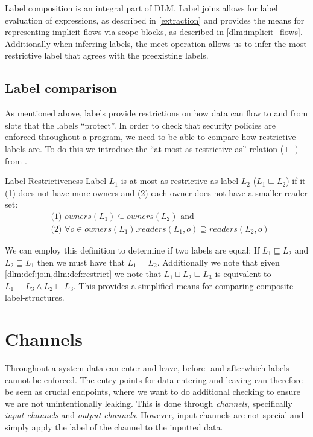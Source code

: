 Label composition is an integral part of DLM.
Label joins allows for label evaluation of expressions, as described in \cref{extraction} and provides the means for representing implicit flows via scope blocks, as described in \cref{dlm:implicit_flows}.
Additionally when inferring labels, the meet operation allows us to infer the most restrictive label that agrees with the preexisting labels.

\subsection{Label comparison}\label{dlm:comparison}
As mentioned above, labels provide restrictions on how data can flow to and from slots that the labels ``protect''.
In order to check that security policies are enforced throughout a program, we need to be able to compare how restrictive labels are.
To do this we introduce the ``at most as restrictive as''-relation ($\sqsubseteq$) from \cite{myers1997}.

\begin{definition}{Label Restrictiveness}\label{dlm:def:restrict}
  Label $L_1$ is at most as restrictive as label $L_2$ ($L_1 \sqsubseteq L_2$) if it (1) does not have more owners and (2) each owner does not have a smaller reader set:
  \begin{align*}
    & \text{(1) } owners(L_1) \subseteq owners(L_2) \text{ and} \\
    & \text{(2) } \forall o \in owners(L_1) . readers(L_1, o) \supseteq readers(L_2, o)
  \end{align*}
\end{definition}

We can employ this definition to determine if two labels are equal:
If $L_1 \sqsubseteq L_2$ and $L_2 \sqsubseteq L_1$ then we must have that $L_1 = L_2$.
Additionally we note that given \cref{dlm:def:join,dlm:def:restrict} we note that $L_1 \sqcup L_2 \sqsubseteq L_3$ is equivalent to $L_1 \sqsubseteq L_3 \wedge L_2 \sqsubseteq L_3$.
This provides a simplified means for comparing composite label-structures.

\section{Channels}\label{dlm:channels}
Throughout a system data can enter and leave, before- and afterwhich labels cannot be enforced.
The entry points for data entering and leaving can therefore be seen as crucial endpoints, where we want to do additional checking to ensure we are not unintentionally leaking.
This is done through \emph{channels}, specifically \emph{input channels} and \emph{output channels}.
However, input channels are not special and simply apply the label of the channel to the inputted data.

